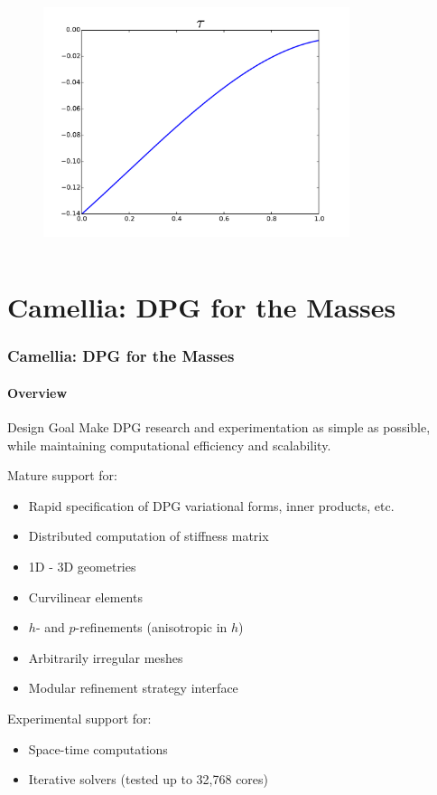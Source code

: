\documentclass[18pt,xcolor=table]{beamer}
\newcounter{nn}
\begin{document}
\begin{frame}[t]
\begin{columns}
\begin{column}{0.5\textwidth}
\begin{figure}[t]
\includegraphics[width=0.8\textwidth]{OptimalTestFunctions/RobustApprox3_tau}
\end{figure}
\end{column}
\end{columns}
\end{frame}


\section{Camellia: DPG for the Masses}
\begin{frame}[fragile]
\frametitle{Camellia: DPG for the Masses}
\framesubtitle{Overview}  %
\begin{block}{Design Goal}
Make DPG research and experimentation as simple as possible, while maintaining computational efficiency and scalability.
\end{block}
Mature support for:
\begin{itemize}
  \item Rapid specification of DPG variational forms, inner products, etc.
  \item Distributed computation of stiffness matrix
  \item 1D - 3D geometries
  \item Curvilinear elements
  \item $h$- and $p$-refinements (anisotropic in $h$)
  \item Arbitrarily irregular meshes
  \item Modular refinement strategy interface
\end{itemize}
Experimental support for:
\begin{itemize}
  \item Space-time computations
  \item Iterative solvers (tested up to 32,768 cores)
\end{itemize}
\end{frame}
\end{document}
